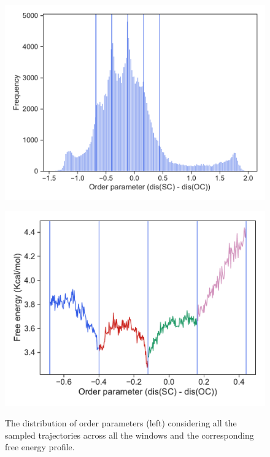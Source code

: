 \documentclass{article}
\begin{document}
\begin{figure}[ht]
  \centering
  \begin{minipage}[b]{0.45\linewidth}
    \includegraphics[scale=0.53]{figures/cumul-dist.pdf}
    \label{fig:cumdist}
  \end{minipage}
  \quad
  \begin{minipage}[b]{0.45\linewidth}
    \includegraphics[scale=0.53]{figures/cumul-fenergy.pdf}
    \label{fig:cumfenergy}
  \end{minipage}
  \caption{The distribution of order parameters (left) considering all the sampled trajectories across all the windows and the corresponding free energy profile.}
\end{figure}
\end{document}
